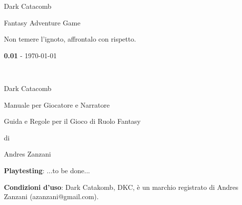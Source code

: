 \documentclass[12pt,a4paper,twoside,openany]{book}
\begin{document}
	
\def \versione {0.01}
\thispagestyle{empty}
 
{\Huge \begin{center}
		Dark Catacomb
\end{center}}

\vfill
\begin{center}
	\Large{\color{black} Fantasy Adventure Game}
\end{center}

\pagebreak

	
\bigskip
Non temere l'ignoto, affrontalo con rispetto.
	
	\vspace{\fill}
\begin{center}\textbf{\versione} - \today\end{center}
\thispagestyle{empty}


\newpage~\thispagestyle{empty}%


\newcommand{\riga}{\rule{\textwidth}{0.4pt}}


{\Huge \begin{center} Dark Catacomb\end{center}}

\bigskip

\begin{center}{\LARGE Manuale per Giocatore e Narratore}\\ \end{center}

{\large \begin{center} Guida e Regole per il Gioco di Ruolo Fantasy \end{center}}

\begin{center}di \end{center}

{\LARGE \begin{center} Andres Zanzani \end{center}}

\vspace{2cm}


\vfill

\begin{mdframed}[roundcorner=10pt]

\medskip

\textbf{Playtesting}: ...to be done...

\bigskip

\begin{flushleft}\textbf{Condizioni d'uso}: Dark Catakomb, DKC, è un marchio registrato di Andres Zanzani (azanzani@gmail.com).
\end{flushleft}

\vspace{0.5cm}


\medskip

\end{mdframed}
\end{document}

